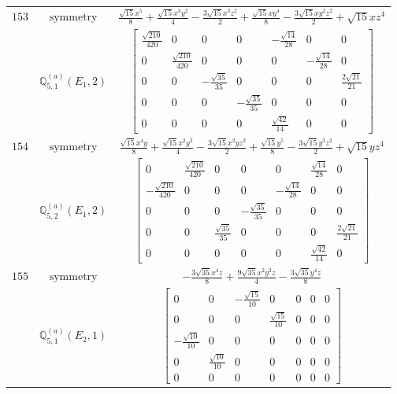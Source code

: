 \documentclass[fleqn,8pt,landscape]{jsarticle}
\begin{document}
\begin{longtable}{ccc}
$ 153 $ & $ \text{symmetry} $ & $ \frac{\sqrt{15} x^{5}}{8} + \frac{\sqrt{15} x^{3} y^{2}}{4} - \frac{3 \sqrt{15} x^{3} z^{2}}{2} + \frac{\sqrt{15} x y^{4}}{8} - \frac{3 \sqrt{15} x y^{2} z^{2}}{2} + \sqrt{15} x z^{4} $ \\
$  $ & $ \mathbb{Q}_{5,1}^{(a)}(E_{1},2) $ & $ \begin{bmatrix} \frac{\sqrt{210}}{420} & 0 & 0 & 0 & - \frac{\sqrt{14}}{28} & 0 & 0 \\ 0 & \frac{\sqrt{210}}{420} & 0 & 0 & 0 & - \frac{\sqrt{14}}{28} & 0 \\ 0 & 0 & - \frac{\sqrt{35}}{35} & 0 & 0 & 0 & \frac{2 \sqrt{21}}{21} \\ 0 & 0 & 0 & - \frac{\sqrt{35}}{35} & 0 & 0 & 0 \\ 0 & 0 & 0 & 0 & \frac{\sqrt{42}}{14} & 0 & 0 \end{bmatrix} $ \\ \hline
$ 154 $ & $ \text{symmetry} $ & $ \frac{\sqrt{15} x^{4} y}{8} + \frac{\sqrt{15} x^{2} y^{3}}{4} - \frac{3 \sqrt{15} x^{2} y z^{2}}{2} + \frac{\sqrt{15} y^{5}}{8} - \frac{3 \sqrt{15} y^{3} z^{2}}{2} + \sqrt{15} y z^{4} $ \\
$  $ & $ \mathbb{Q}_{5,2}^{(a)}(E_{1},2) $ & $ \begin{bmatrix} 0 & \frac{\sqrt{210}}{420} & 0 & 0 & 0 & \frac{\sqrt{14}}{28} & 0 \\ - \frac{\sqrt{210}}{420} & 0 & 0 & 0 & - \frac{\sqrt{14}}{28} & 0 & 0 \\ 0 & 0 & 0 & - \frac{\sqrt{35}}{35} & 0 & 0 & 0 \\ 0 & 0 & \frac{\sqrt{35}}{35} & 0 & 0 & 0 & \frac{2 \sqrt{21}}{21} \\ 0 & 0 & 0 & 0 & 0 & \frac{\sqrt{42}}{14} & 0 \end{bmatrix} $ \\ \hline
$ 155 $ & $ \text{symmetry} $ & $ - \frac{3 \sqrt{35} x^{4} z}{8} + \frac{9 \sqrt{35} x^{2} y^{2} z}{4} - \frac{3 \sqrt{35} y^{4} z}{8} $ \\
$  $ & $ \mathbb{Q}_{5,1}^{(a)}(E_{2},1) $ & $ \begin{bmatrix} 0 & 0 & - \frac{\sqrt{15}}{10} & 0 & 0 & 0 & 0 \\ 0 & 0 & 0 & \frac{\sqrt{15}}{10} & 0 & 0 & 0 \\ - \frac{\sqrt{10}}{10} & 0 & 0 & 0 & 0 & 0 & 0 \\ 0 & \frac{\sqrt{10}}{10} & 0 & 0 & 0 & 0 & 0 \\ 0 & 0 & 0 & 0 & 0 & 0 & 0 \end{bmatrix} $ \\ \hline

\end{longtable}
\end{document}
